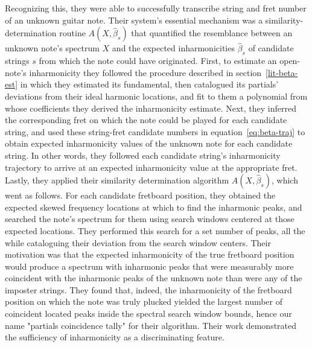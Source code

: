 \documentclass[12pt]{cmuthesis}
\begin{document}
Recognizing this, they were able to successfully transcribe string and fret number of an unknown guitar note. Their system's essential mechanism was a similarity-determination routine $A(X,\hat{\beta}_s)$ that quantified the resemblance between an unknown note's spectrum $X$ and the expected inharmonicities $\hat\beta_s$ of candidate strings $s$ from which the note could have originated. First, to estimate an open-note's inharmonicity they followed the procedure described in section~\ref{lit-beta-est} in which they estimated its fundamental, then catalogued its partials' deviations from their ideal harmonic locations, and fit to them a polynomial from whose coefficients they derived the inharmonicity estimate. Next, they inferred the corresponding fret on which the note could be played for each candidate string, and used these string-fret candidate numbers in equation~\eqref{eq:beta-traj} to obtain expected inharmonicity values of the unknown note for each candidate string. In other words, they followed each candidate string's inharmonicity trajectory to arrive at an expected inharmonicity value at the appropriate fret. Lastly, they applied their similarity determination algorithm $A(X,\hat{\beta}_s)$, which went as follows. For each candidate fretboard position, they obtained the expected skewed frequency locations at which to find the inharmonic peaks, and searched the note's spectrum for them using search windows centered at those expected locations. They performed this search for a set number of peaks, all the while cataloguing their deviation from the search window centers. Their motivation was that the expected inharmonicity of the true fretboard position would produce a spectrum with inharmonic peaks that were measurably more coincident with the inharmonic peaks of the unknown note than were any of the imposter strings. They found that, indeed, the inharmonicity of the fretboard position on which the note was truly plucked yielded the largest number of coincident located peaks inside the spectral search window bounds, hence our name "partials coincidence tally" for their algorithm. Their work demonstrated the sufficiency of inharmonicity as a discriminating feature.
\end{document}
